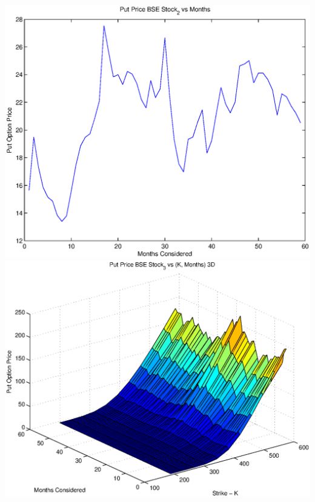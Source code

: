 \documentclass{article}
\begin{document}
\includegraphics[width=\textwidth]{Put_Price_BSE_Stock_2_vs_Months} \\

\includegraphics[width=\textwidth]{Put_Price_BSE_Stock_3_vs_(K,_Months)_3D} \\
\end{document}
